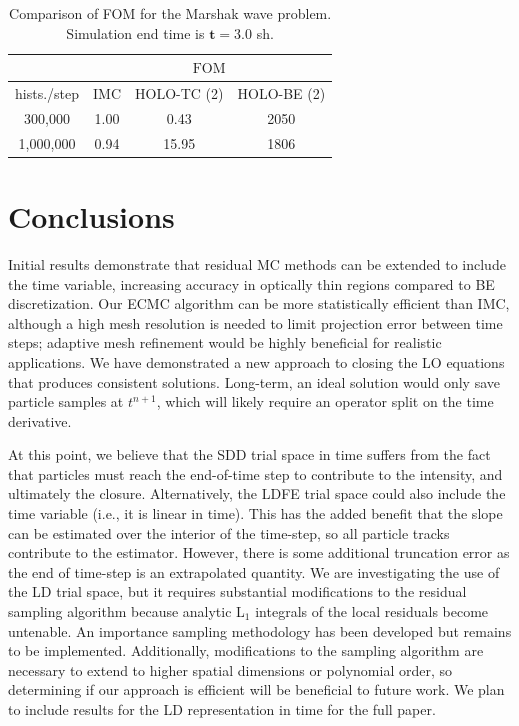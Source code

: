 \documentclass{anstrans}
\newcommand{\FOM}{\ensuremath{\text{FOM}}}
\begin{document}
\begin{table}[H]
\centering
\caption{\label{tab:marshak_cont} {Comparison of FOM for the Marshak
    wave problem.  Simulation end time is $\mathbf{t=3.0}$ sh.}}
\begin{tabular}{|c|ccc|}\cline{2-4}
    \multicolumn{1}{c|}{}        &
    \multicolumn{3}{|c|}{\FOM} \\ \hline
hists./step    &  IMC   & HOLO-TC (2) & HOLO-BE (2) \\ \hline
  300,000      &  1.00  &   0.43    & 2050          \\  
  1,000,000    &  0.94  &  15.95    & 1806          \\ \hline
\end{tabular}
\end{table}


\section{Conclusions}

Initial results demonstrate that residual MC methods can be extended to include the time
variable, increasing accuracy in optically thin regions compared to BE discretization.  Our ECMC algorithm can be more statistically efficient than IMC, although a
high mesh resolution is needed to limit projection error between time steps; adaptive mesh refinement would be
highly beneficial for realistic applications.  We have demonstrated a new approach to
closing the LO equations that produces consistent solutions. Long-term, an ideal solution
would only save particle samples at $t^{n+1}$, which will likely require an operator split
on the time derivative.

At this point, we believe that the SDD trial space in time suffers from the fact that particles must
reach the end-of-time step to contribute to the intensity, and ultimately the closure.  Alternatively, the LDFE trial space
could also include the time variable (i.e., it is linear in time).  This has the added
benefit that the slope can be estimated over the interior of the time-step, so all
particle tracks contribute to the estimator.  However, there is some additional truncation
error as the end of time-step is an extrapolated quantity.  We are investigating the use
of the LD trial space, but it requires substantial modifications to the residual sampling
algorithm because analytic L$_1$ integrals of the local residuals become untenable.  An
importance sampling methodology has been developed but remains to be implemented.  Additionally, modifications to the sampling
algorithm are necessary to extend to higher spatial dimensions or polynomial order, so determining if our
approach is efficient will be beneficial to future work. We plan to include results
for the LD representation in time for the full paper. 





\end{document}
